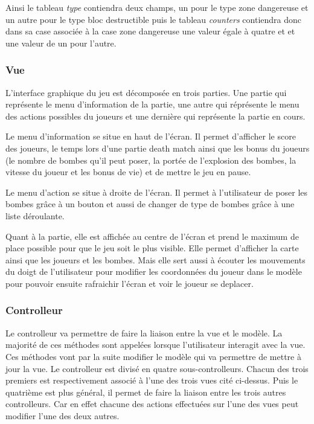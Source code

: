 		Ainsi le tableau \textit{type} contiendra deux champs, un pour le 
		type zone dangereuse et un autre pour le type bloc destructible puis 
		le tableau \textit{counters} contiendra donc dans sa case associée à 
		la case zone dangereuse une valeur égale à quatre et et une valeur de
		un pour l'autre.
		
	
	\subsubsection{Vue}
	
		L'interface graphique du jeu est décomposée en trois parties.
		Une partie qui représente le menu d'information de la partie, 
		une autre qui réprésente le menu des actions possibles du joueurs 
		et une dernière qui représente la partie en cours.
		
		Le menu d'information se situe en haut de l'écran.
		Il permet d'afficher le score des joueurs, le temps lors d'une partie 
		death match ainsi que les bonus du joueurs (le nombre de bombes qu'il 
		peut poser, la portée de l'explosion des bombes, la vitesse du joueur 
		et les bonus de vie) et de mettre le jeu en pause.
		
		Le menu d'action se situe à droite de l'écran.
		Il permet à l'utilisateur de poser les bombes grâce à un bouton 
		et aussi de changer de type de bombes grâce à une liste déroulante.
	
		Quant à la partie, elle est affichée au centre de l'écran et prend le 
		maximum de place possible pour que le jeu soit le plus visible.
		Elle permet d'afficher la carte ainsi que les joueurs et les bombes.
		Mais elle sert aussi à écouter les mouvements du doigt de l'utilisateur
		pour modifier les coordonnées du joueur dans le modèle pour pouvoir 
		ensuite rafraichir l'écran et voir le joueur se deplacer.	
	
	
	\subsubsection{Controlleur}
	
		Le controlleur va permettre de faire la liaison entre la vue et le modèle.
		La majorité de ces méthodes sont appelées lorsque l'utilisateur interagit avec la vue.
		Ces méthodes vont par la suite modifier le modèle qui va permettre de mettre à jour la vue.
		Le controlleur est divisé en quatre sous-controlleurs.
		Chacun des trois premiers est respectivement associé à l'une des trois vues cité ci-dessus.
		Puis le quatrième est plus général, il permet de faire la liaison entre les trois autres controlleurs.
		Car en effet chacune des actions effectuées sur l'une des vues peut modifier l'une des deux autres.
	
